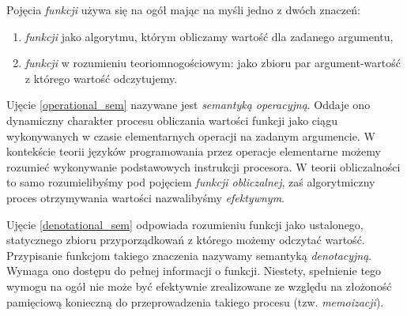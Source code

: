 Pojęcia \emph{funkcji} używa się na ogół mając na myśli jedno z dwóch znaczeń:
\begin{enumerate}[label=(\arabic*)]
  \setlength\itemsep{0em}
  \item \emph{funkcji} jako algorytmu, którym obliczamy wartość dla zadanego argumentu,\label{operational_sem}
  \item \emph{funkcji} w rozumieniu teoriomnogościowym: jako zbioru par argument-wartość z którego wartość odczytujemy.
\label{denotational_sem}
\end{enumerate}
Ujęcie \ref{operational_sem} nazywane jest \emph{semantyką operacyjną}. Oddaje ono dynamiczny charakter procesu obliczania wartości funkcji jako ciągu wykonywanych w czasie elementarnych operacji na zadanym argumencie. W kontekście teorii języków programowania przez operacje elementarne możemy rozumieć wykonywanie podstawowych instrukcji procesora. W teorii obliczalności to samo rozumielibyśmy pod pojęciem \emph{funkcji obliczalnej}, zaś algorytmiczny proces otrzymywania wartości nazwalibyśmy \emph{efektywnym}.

Ujęcie \ref{denotational_sem} odpowiada rozumieniu funkcji jako ustalonego, statycznego zbioru przyporządkowań z którego możemy odczytać wartość. Przypisanie funkcjom takiego znaczenia nazywamy semantyką \emph{denotacyjną}. Wymaga ono dostępu do pełnej informacji o funkcji. Niestety, spełnienie tego wymogu na ogół nie może być efektywnie zrealizowane ze względu na złożoność pamięciową konieczną do przeprowadzenia takiego procesu (tzw. \emph{memoizacji}).
